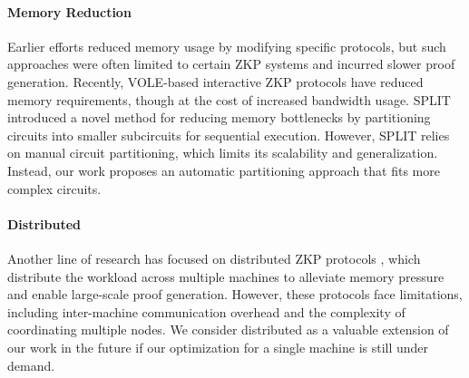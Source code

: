 \paragraph{Memory Reduction}  
Earlier efforts \cite{bootle2022gemini} reduced memory usage by modifying specific protocols, but such approaches were often limited to certain ZKP systems and incurred slower proof generation. Recently, VOLE-based interactive ZKP protocols \cite{baum2021mac, dittmer2020line, weng2021wolverine} have reduced memory requirements, though at the cost of increased bandwidth usage. SPLIT \cite{qi2023split} introduced a novel method for reducing memory bottlenecks by partitioning circuits into smaller subcircuits for sequential execution. However, SPLIT relies on manual circuit partitioning, which limits its scalability and generalization. Instead, our work proposes an automatic partitioning approach that fits more complex circuits. 


\paragraph{Distributed \zk}  
Another line of research has focused on distributed ZKP protocols \cite{wu2018dizk, liu2024pianist, xie2022zkbridge, sang2023automating}, which distribute the workload across multiple machines to alleviate memory pressure and enable large-scale proof generation. However, these protocols face limitations, including inter-machine communication overhead and the complexity of coordinating multiple nodes. 
We consider distributed \zk as a valuable extension of our work in the future if our optimization for a single machine is still under demand. 


